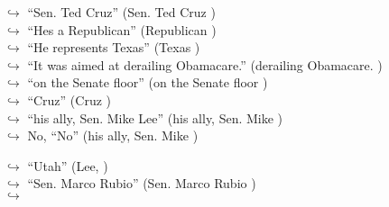 \documentclass[11pt,a4paper, onecolumn]{article}
\begin{document}
\begin{figure}[t] \small \begin{tcolorbox}[boxsep=0pt,left=5pt,right=0pt,top=2pt,colback = yellow!5] \begin{dialogue}
 \small 
\colorbox{pink!25}{$\hookrightarrow$}
{ ``Sen. Ted Cruz'' (Sen. Ted Cruz ) }
\\
\colorbox{pink!25}{$\hookrightarrow$}
{ ``Hes a Republican'' (Republican ) }
\\
\colorbox{pink!25}{$\hookrightarrow$}
{ ``He represents Texas'' (Texas ) }
\\
\colorbox{pink!25}{$\hookrightarrow$}
{ ``It was aimed at derailing Obamacare.'' (derailing Obamacare. ) }
\\
\colorbox{pink!25}{$\hookrightarrow$}
{ ``on the Senate floor'' (on the Senate floor ) }
\\
\colorbox{pink!25}{$\hookrightarrow$}
{ ``Cruz'' (Cruz ) }
\\
\colorbox{pink!25}{$\hookrightarrow$}
{ ``his ally, Sen. Mike Lee'' (his ally, Sen. Mike ) }
\\
\colorbox{pink!25}{$\hookrightarrow$}
\colorbox{red!25}{No,}
{ ``No'' (his ally, Sen. Mike ) }
 \end{dialogue}\end{tcolorbox}\end{figure}\begin{figure}[t] \small \begin{tcolorbox}[boxsep=0pt,left=5pt,right=0pt,top=2pt,colback = yellow!5] \begin{dialogue}
 \small 
\colorbox{pink!25}{$\hookrightarrow$}
{ ``Utah'' (Lee, ) }
\\
\colorbox{pink!25}{$\hookrightarrow$}
{ ``Sen. Marco Rubio'' (Sen. Marco Rubio ) }
\\
\colorbox{pink!25}{$\hookrightarrow$}

\end{dialogue}
\end{tcolorbox}
\end{figure}
\end{document}
